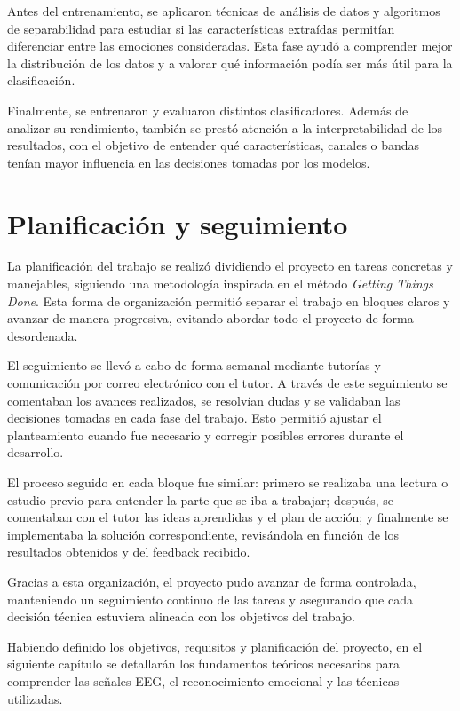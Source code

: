 Antes del entrenamiento, se aplicaron técnicas de análisis de datos y algoritmos de separabilidad para estudiar si las características extraídas permitían diferenciar entre las emociones consideradas. Esta fase ayudó a comprender mejor la distribución de los datos y a valorar qué información podía ser más útil para la clasificación.

Finalmente, se entrenaron y evaluaron distintos clasificadores. Además de analizar su rendimiento, también se prestó atención a la interpretabilidad de los resultados, con el objetivo de entender qué características, canales o bandas tenían mayor influencia en las decisiones tomadas por los modelos.

\section{Planificación y seguimiento}

La planificación del trabajo se realizó dividiendo el proyecto en tareas concretas y manejables, siguiendo una metodología inspirada en el método \textit{Getting Things Done}\cite{allen2015gtd}. Esta forma de organización permitió separar el trabajo en bloques claros y avanzar de manera progresiva, evitando abordar todo el proyecto de forma desordenada.

El seguimiento se llevó a cabo de forma semanal mediante tutorías y comunicación por correo electrónico con el tutor. A través de este seguimiento se comentaban los avances realizados, se resolvían dudas y se validaban las decisiones tomadas en cada fase del trabajo. Esto permitió ajustar el planteamiento cuando fue necesario y corregir posibles errores durante el desarrollo.

El proceso seguido en cada bloque fue similar: primero se realizaba una lectura o estudio previo para entender la parte que se iba a trabajar; después, se comentaban con el tutor las ideas aprendidas y el plan de acción; y finalmente se implementaba la solución correspondiente, revisándola en función de los resultados obtenidos y del feedback recibido.

Gracias a esta organización, el proyecto pudo avanzar de forma controlada, manteniendo un seguimiento continuo de las tareas y asegurando que cada decisión técnica estuviera alineada con los objetivos del trabajo.

Habiendo definido los objetivos, requisitos y planificación del proyecto, en el siguiente capítulo se detallarán los fundamentos teóricos necesarios para comprender las señales \ac{EEG}, el reconocimiento emocional y las técnicas utilizadas.
